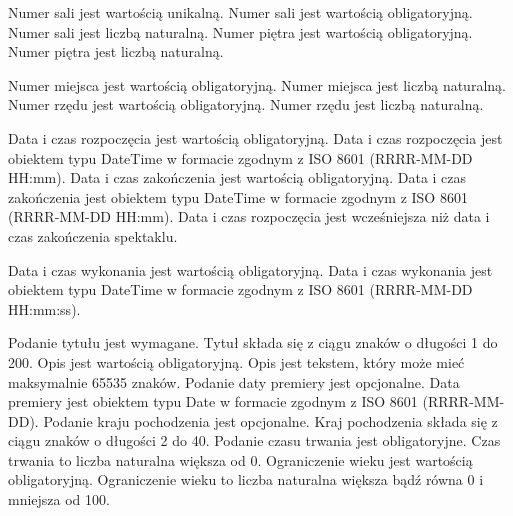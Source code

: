 \begin{ograniczenia}
    \ograniczenie Numer sali jest wartością unikalną.
    \ograniczenie Numer sali jest wartością obligatoryjną.
    \ograniczenie Numer sali jest liczbą naturalną.
    \ograniczenie Numer piętra jest wartością obligatoryjną.
    \ograniczenie Numer piętra jest liczbą naturalną.
\end{ograniczenia}

\begin{ograniczenia}
    \ograniczenie Numer miejsca jest wartością obligatoryjną.
    \ograniczenie Numer miejsca jest liczbą naturalną.
    \ograniczenie Numer rzędu jest wartością obligatoryjną.
    \ograniczenie Numer rzędu jest liczbą naturalną.
\end{ograniczenia}

\begin{ograniczenia}
    \ograniczenie Data i czas rozpoczęcia jest wartością obligatoryjną.
    \ograniczenie Data i czas rozpoczęcia jest obiektem typu DateTime w formacie zgodnym z ISO 8601 (RRRR-MM-DD HH:mm).
    \ograniczenie Data i czas zakończenia jest wartością obligatoryjną.
    \ograniczenie Data i czas zakończenia jest obiektem typu DateTime w formacie zgodnym z ISO 8601 (RRRR-MM-DD HH:mm).
    \ograniczenie Data i czas rozpoczęcia jest wcześniejsza niż data i czas zakończenia spektaklu.
\end{ograniczenia}

\begin{ograniczenia}
    \ograniczenie Data i czas wykonania jest wartością obligatoryjną.
    \ograniczenie Data i czas wykonania jest obiektem typu DateTime w formacie zgodnym z ISO 8601 (RRRR-MM-DD HH:mm:ss).
\end{ograniczenia}

\begin{ograniczenia}
    \ograniczenie Podanie tytułu jest wymagane.
    \ograniczenie Tytuł składa się z ciągu znaków o długości 1 do 200.
    \ograniczenie Opis jest wartością obligatoryjną.
    \ograniczenie Opis jest tekstem, który może mieć maksymalnie 65535 znaków.
    \ograniczenie Podanie daty premiery jest opcjonalne.
    \ograniczenie Data premiery jest obiektem typu Date w formacie zgodnym z ISO 8601 (RRRR-MM-DD).
    \ograniczenie Podanie kraju pochodzenia jest opcjonalne.
    \ograniczenie Kraj pochodzenia składa się z ciągu znaków o długości 2 do 40.
    \ograniczenie Podanie czasu trwania jest obligatoryjne.
    \ograniczenie Czas trwania to liczba naturalna większa od 0.
    \ograniczenie Ograniczenie wieku jest wartością obligatoryjną.
    \ograniczenie Ograniczenie wieku to liczba naturalna większa bądź równa 0 i mniejsza od 100.
\end{ograniczenia}

